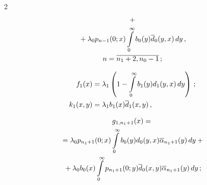 \begin{multicols}{2}
\begin{multline*}
+{}\\


{}+ \lambda_0 p_{n-1}(0;x) \int\limits_0^\infty b_0(y) \d_0(y,x)\, dy\,,


\\ 


n=\overline{n_1+2,n_0-1}\,;


\end{multline*}




\begin{align}


\label{3-gf-1-m}


f_1(x)&= \lambda_1 \left(


1 - \int\limits_0^\infty b_1(y) d_1(y,x)\, dy\right)\,;


\\


\label{3-gf-2-m}


k_1(x,y) &= \lambda_1 b_1(x) \d_1(x,y) \,,


\end{align}







\vspace*{-12pt}





\noindent


\begin{multline*}


g_{1,n_1+1}(x)={}\\


 {}=\lambda_0 p_{n_1+1}(0;x)\int\limits_0^\infty b_0(y) d_0(y,x) 


\oa_{n_1+1}(y)\, dy


+{}


\\


{}+ \lambda_0 b_0(x) \int\limits_0^\infty p_{n_1+1}(0;y) \d_0(x,y) \oa_{n_1+1}(y)\, dy\,;


\end{multline*}










\vspace*{-12pt}






\end{multicols}

